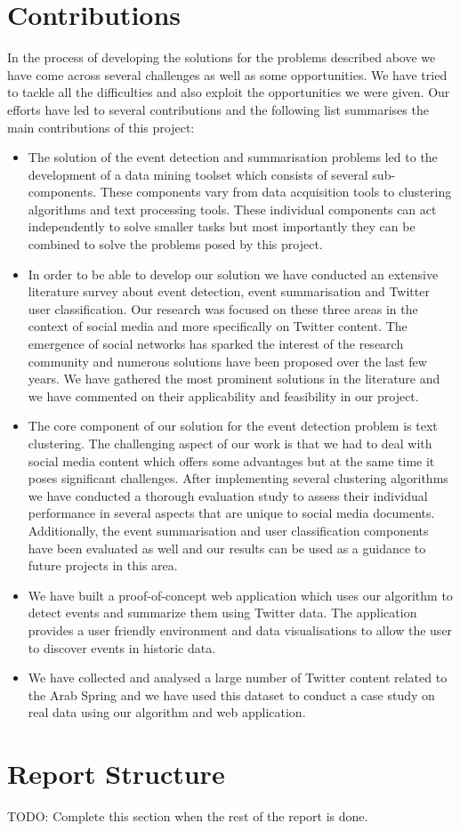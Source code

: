 \section{Contributions}
In the process of developing the solutions for the problems described above we have come across several
challenges as well as some opportunities. We have tried to tackle all the difficulties and also exploit the 
opportunities we were given. Our efforts have led to several contributions and the following list summarises the main contributions of this project:
\begin{itemize}
 \item The solution of the event detection and summarisation problems led to the development of a data mining toolset which consists of 
 several sub-components. These components vary from data acquisition tools to clustering algorithms and text processing tools. These
 individual components can act independently to solve smaller tasks but most importantly they can be combined to solve the problems posed 
 by this project.  
 \item In order to be able to develop our solution we have conducted an extensive literature survey about event detection, event summarisation and Twitter user classification. 
 Our research was focused on these three areas in the context of social media and more specifically on Twitter content. The emergence of social networks has sparked the interest of the research community and 
 numerous solutions have been proposed over the last few years. We have gathered the most prominent solutions in the literature and we have commented on their applicability and 
 feasibility in our project.
 \item The core component of our solution for the event detection problem is text clustering. The challenging aspect of our work is that we had to deal with social media content
 which offers some advantages but at the same time it poses significant challenges. After implementing several clustering algorithms we have conducted a thorough evaluation study to assess their individual performance in several aspects that are unique to social media documents. Additionally, the event summarisation and user classification components have been evaluated as well and our results can be used as a guidance to future projects in this area.      
 \item We have built a proof-of-concept web application which uses our algorithm to detect events and summarize them using Twitter data. The application provides a user friendly
 environment and data visualisations to allow the user to discover events in historic data.
 \item We have collected and analysed a large number of Twitter content related to the Arab Spring and we have used this dataset to conduct a case study on real data using
 our algorithm and web application.  	 
\end{itemize}\vspace{15pt}
\section{Report Structure}
TODO: Complete this section when the rest of the report is done.


